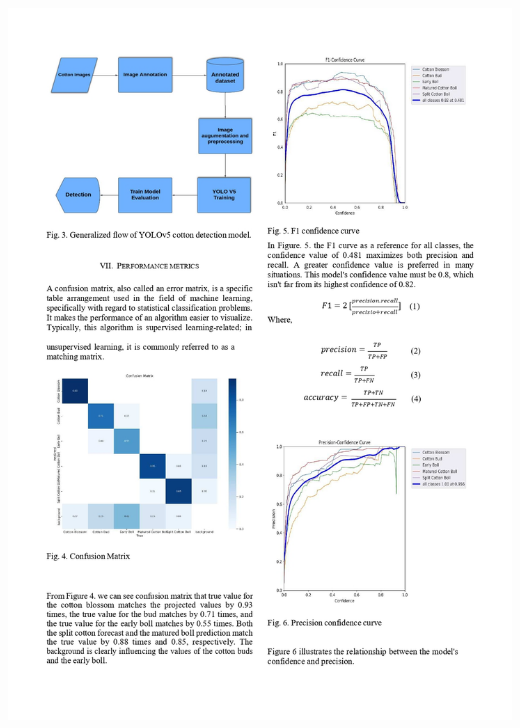 \documentclass[12pt,a4paper]{report}
\begin{document}
\includegraphics[scale=0.7]{images/copyright/publication/Publication/Publication_page-0005.jpg}
\newpage
\end{document}
